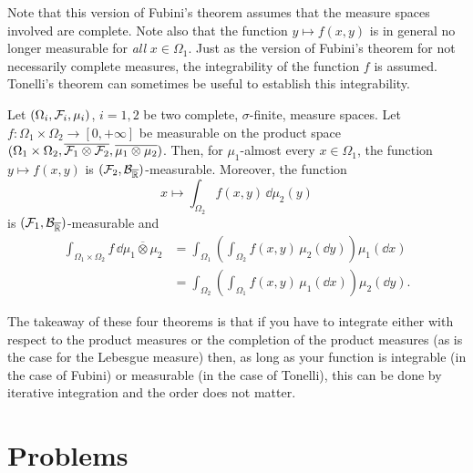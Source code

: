 Note that this version of Fubini's theorem assumes that the measure spaces involved are complete. 
Note also that the function $y \mapsto f(x,y)$ is in general no longer measurable for \emph{all} $x \in \Omega_1$. Just as the version of Fubini's theorem for not necessarily complete measures, the integrability of the function $f$ is assumed. Tonelli's theorem can sometimes be useful to establish this integrability.

\begin{theorem}
	Let $(\Omega_i, \mathcal F_i, \mu_i)$, $i=1,2$ be two complete, $\sigma$-finite, measure spaces. 
	Let $f : \Omega_1 \times \Omega_2 \to [0,+\infty]$ be measurable on the product space $(\Omega_1 \times \Omega_2, \overline{\mathcal F_1 \otimes \mathcal F_2}, \overline{\mu_1 \otimes \mu_2})$. Then, for $\mu_1$-almost every $x \in \Omega_1$, the function $y \mapsto f(x, y)$ is $(\mathcal F_2,\mathcal B_{\overline{\mathbb R}})$-measurable. Moreover, the function 
	\[
	x \mapsto \int_{\Omega_2} f(x,y)\, \dd \mu_2(y)
	\]
	is $(\mathcal F_1,\mathcal B_{\overline{\mathbb R}})$-measurable and
	\[
	\begin{split}
	\int_{\Omega_1 \times \Omega_2} f \,\dd \overline{\mu_1 \otimes \mu_2} 
	&= \int_{\Omega_1} \left( \int_{\Omega_2 } f(x,  y ) \,\mu_2(\dd y) \right) \mu_1(\dd x)\\
	&= \int_{\Omega_2} \left( \int_{\Omega_1} f(x, y)  \,\mu_1(\dd x) \right) \mu_2(\dd y).
	\end{split}
	\] 	
\end{theorem}

The takeaway of these four theorems is that if you have to integrate either with respect to the product measures or the completion of the product measures (as is the case for the Lebesgue measure) then, as long as your function is integrable (in the case of Fubini) or measurable (in the case of Tonelli), this can be done by iterative integration and the order does not matter.


\section{Problems}

